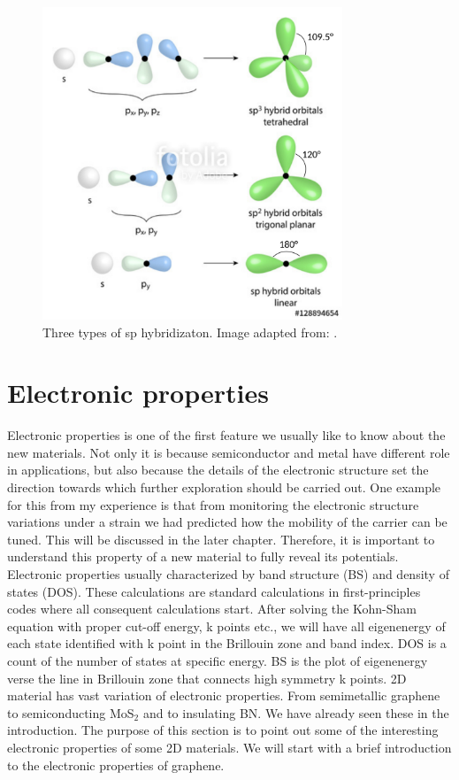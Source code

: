 \begin{figure}[htbp!] 
\centering  
\includegraphics[width=0.8\textwidth]{sp_hybrid.png}
\caption{Three types of sp hybridizaton. Image adapted from: \cite{sp_hybrid}. }  
\label{fig:sp_hybrid}
\end{figure} 


\section{Electronic properties}

Electronic properties is one of the first feature we usually like to know about the new materials. Not only it is because semiconductor and metal have different role in applications, but also because the details of the electronic structure set the direction towards which further exploration should be carried out. One example for this from my experience is that from monitoring the electronic structure variations under a strain we had predicted how the mobility of the carrier can be tuned. This will be discussed in the later chapter. Therefore, it is important to understand this property of a new material to fully reveal its potentials. Electronic properties usually characterized by band structure (BS) and density of states (DOS). These calculations are standard calculations in first-principles codes where all consequent calculations start. After solving the Kohn-Sham equation with proper cut-off energy, k points etc., we will have all eigenenergy of each state identified with k point in the Brillouin zone and band index.  DOS is a count of the number of states at specific energy. BS is the plot of eigenenergy verse the line in Brillouin zone that connects high symmetry k points.  2D material has vast variation of electronic properties. From semimetallic graphene to semiconducting MoS$_2$ and to insulating BN. We have already seen these in the introduction. The purpose of this section is to point out some of the interesting electronic properties of some 2D materials. We will start with a brief introduction to the electronic properties of graphene.

